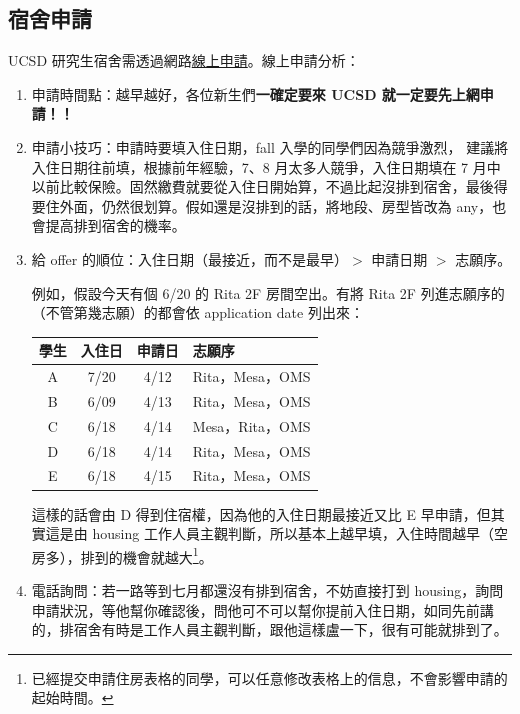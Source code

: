 \documentclass[10pt,a4paper]{book}
\begin{document}
\begin{CJK}{UTF8}{bkai}
\begin{enumerate}
\end{enumerate}

\subsection{宿舍申請}
UCSD 研究生宿舍需透過網路\href{https://hdh.ucsd.edu/ARCHWaitList/ARCHMainMenu.aspx}{線上申請}。線上申請分析：

\begin{enumerate}
\item 申請時間點：越早越好，各位新生們\textbf{一確定要來 UCSD 就一定要先上網申請！！}
\item 申請小技巧：申請時要填入住日期，fall 入學的同學們因為競爭激烈， 建議將入住日期往前填，根據前年經驗，7、8 月太多人競爭，入住日期填在 7 月中以前比較保險。固然繳費就要從入住日開始算，不過比起沒排到宿舍，最後得要住外面，仍然很划算。假如還是沒排到的話，將地段、房型皆改為 any，也會提高排到宿舍的機率。
\item 給 offer 的順位：入住日期（最接近，而不是最早）$>$ 申請日期 $>$ 志願序。

例如，假設今天有個 6/20 的 Rita 2F 房間空出。有將 Rita 2F 列進志願序的（不管第幾志願）的都會依 application date 列出來：

\begin{center}
\begin{tabular}{c c c p{3cm}}
\hline
學生 & 入住日 & 申請日 & 志願序\\
\hline
A & 7/20 & 4/12 & Rita，Mesa，OMS\\
B & 6/09 & 4/13 & Rita，Mesa，OMS\\
C & 6/18 & 4/14 & Mesa，Rita，OMS\\
D & 6/18 & 4/14 & Rita，Mesa，OMS\\
E & 6/18 & 4/15 & Rita，Mesa，OMS\\
\hline
\end{tabular}
\end{center}

這樣的話會由 D 得到住宿權，因為他的入住日期最接近又比 E 早申請，但其實這是由 housing 工作人員主觀判斷，所以基本上越早填，入住時間越早（空房多），排到的機會就越大\footnote{已經提交申請住房表格的同學，可以任意修改表格上的信息，不會影響申請的起始時間。}。

\item 電話詢問：若一路等到七月都還沒有排到宿舍，不妨直接打到 housing，詢問申請狀況，等他幫你確認後，問他可不可以幫你提前入住日期，如同先前講的，排宿舍有時是工作人員主觀判斷，跟他這樣盧一下，很有可能就排到了。


\end{enumerate}
\end{CJK}
\end{document}
